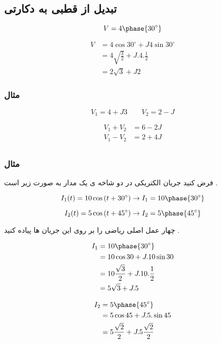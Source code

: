 \documentclass[12pt]{book}
\begin{document}
\subsection{تبدیل از قطبی به دکارتی}


$$
V = 4 \phase{30^{\circ}}
$$


\begin{align*}
V &= 4 \cos{30^{\circ}} + J 4 \sin{30^{\circ}} \\
&= 4 \sqrt{\frac{3}{2}} + J . 4 . \frac{1}{2} \\
&= 2 \sqrt{3} + J 2 
\end{align*}




\subsubsection{مثال}

$$
V_{1} = 4 + J 3 \qquad V_{2} = 2 - J  
$$


\begin{align*}
V_{1} + V_{2} &= 6 - 2 J \\
V_{1} - V_{2} &= 2 + 4 J \\
\end{align*}



\subsubsection{مثال}

فرض کنید جریان الکتریکی در دو شاخه ی یک مدار به صورت زیر است .

$$
I_{1}(t) = 10 \cos{(t + 30^{\circ})} \to I_{1} = 10 \phase{30^{\circ}}
$$

$$
I_{2}(t) = 5 \cos{(t + 45^{\circ})} \to I_{2} = 5 \phase{45^{\circ}}
$$


چهار عمل اصلی ریاضی را بر روی این جریان ها پیاده کنید .


\begin{align*}
I_{1} &= 10 \phase{30^{\circ}} \\
&= 10 \cos{30} + J . 10 \sin{30} \\
&= 10 \frac{\sqrt{3}}{2} + J . 10 . \frac{1}{2} \\
&= 5 \sqrt{3} + J . 5
\end{align*}



\begin{align*}
I_{2} &= 5 \phase{45^{\circ}} \\
&= 5 \cos{45} + J . 5 . \sin{45} \\
&= 5 \frac{\sqrt{2}}{2} + J . 5  \frac{\sqrt{2}}{2} \\
\end{align*}
\end{document}
